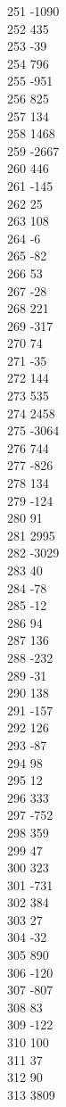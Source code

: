 { 251	-1090 \\
 252	435 \\
 253	-39 \\
 254	796 \\
 255	-951 \\
 256	825 \\
 257	134 \\
 258	1468 \\
 259	-2667 \\
 260	446 \\
 261	-145 \\
 262	25 \\
 263	108 \\
 264	-6 \\
 265	-82 \\
 266	53 \\
 267	-28 \\
 268	221 \\
 269	-317 \\
 270	74 \\
 271	-35 \\
 272	144 \\
 273	535 \\
 274	2458 \\
 275	-3064 \\
 276	744 \\
 277	-826 \\
 278	134 \\
 279	-124 \\
 280	91 \\
 281	2995 \\
 282	-3029 \\
 283	40 \\
 284	-78 \\
 285	-12 \\
 286	94 \\
 287	136 \\
 288	-232 \\
 289	-31 \\
 290	138 \\
 291	-157 \\
 292	126 \\
 293	-87 \\
 294	98 \\
 295	12 \\
 296	333 \\
 297	-752 \\
 298	359 \\
 299	47 \\
 300	323 \\
 301	-731 \\
 302	384 \\
 303	27 \\
 304	-32 \\
 305	890 \\
 306	-120 \\
 307	-807 \\
 308	83 \\
 309	-122 \\
 310	100 \\
 311	37 \\
 312	90 \\
 313	3809 \\
}
